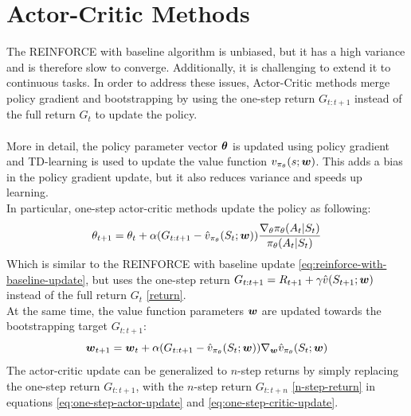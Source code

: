 \section{Actor-Critic Methods}
The REINFORCE with baseline algorithm is unbiased, but it has a high variance and is therefore slow to converge. Additionally, it is challenging to extend it to continuous tasks. In order to address these issues, Actor-Critic methods merge policy gradient and bootstrapping by using the one-step return $G_{t:t+1}$ instead of the full return $G_t$ to update the policy.\\\\
More in detail, the policy parameter vector $\boldsymbol{\theta}$ is updated using policy gradient and TD-learning is used to update the value function $v_{\pi_{\theta}}(s; \boldsymbol{w})$. This adds a bias in the policy gradient update, but it also reduces variance and speeds up learning.\\
In particular, one-step actor-critic methods update the policy as following:
\begin{equation}
    \theta_{t+1} = \theta_t + \alpha (G_{t:t+1} - \hat{v}_{\pi_{\theta}}(S_t; \boldsymbol{w})) \frac{\nabla_{\theta} \pi_{\theta}(A_t|S_t)}{\pi_{\theta}(A_t|S_t)}
    \label{eq:one-step-actor-update}
\end{equation}
Which is similar to the REINFORCE with baseline update \eqref{eq:reinforce-with-baseline-update}, but uses the one-step return $G_{t:t+1} = R_{t+1} + \gamma \hat{v}(S_{t+1}; \boldsymbol{w})$ instead of the full return $G_t$ \eqref{return}.\\
At the same time, the value function parameters $\boldsymbol{w}$ are updated towards the bootstrapping target $G_{t:t+1}$:
\begin{equation}
    \boldsymbol{w}_{t+1} = \boldsymbol{w}_t + \alpha (G_{t:t+1} - \hat{v}_{\pi_{\theta}}(S_t; \boldsymbol{w})) \nabla_{\boldsymbol{w}} \hat{v}_{\pi_{\theta}}(S_t; \boldsymbol{w})
    \label{eq:one-step-critic-update}
\end{equation}
The actor-critic update can be generalized to $n$-step returns by simply replacing the one-step return $G_{t:t+1}$, with the $n$-step return $G_{t:t+n}$ \eqref{n-step-return} in equations \eqref{eq:one-step-actor-update} and \eqref{eq:one-step-critic-update}.\\

